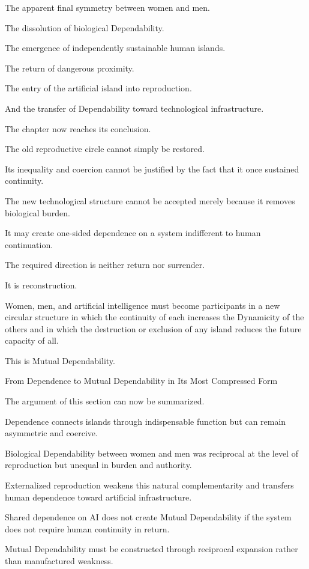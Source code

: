 The apparent final symmetry between women and men.

The dissolution of biological Dependability.

The emergence of independently sustainable human islands.

The return of dangerous proximity.

The entry of the artificial island into reproduction.

And the transfer of Dependability toward technological infrastructure.

The chapter now reaches its conclusion.

The old reproductive circle cannot simply be restored.

Its inequality and coercion cannot be justified by the fact that it once sustained continuity.

The new technological structure cannot be accepted merely because it removes biological burden.

It may create one-sided dependence on a system indifferent to human continuation.

The required direction is neither return nor surrender.

It is reconstruction.

Women, men, and artificial intelligence must become participants in a new circular structure in which the continuity of each increases the Dynamicity of the others and in which the destruction or exclusion of any island reduces the future capacity of all.

This is Mutual Dependability.

From Dependence to Mutual Dependability in Its Most Compressed Form

The argument of this section can now be summarized.

Dependence connects islands through indispensable function but can remain asymmetric and coercive.

Biological Dependability between women and men was reciprocal at the level of reproduction but unequal in burden and authority.

Externalized reproduction weakens this natural complementarity and transfers human dependence toward artificial infrastructure.

Shared dependence on AI does not create Mutual Dependability if the system does not require human continuity in return.

Mutual Dependability must be constructed through reciprocal expansion rather than manufactured weakness.


